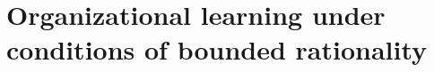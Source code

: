 \documentclass[12pt, man, natbib]{apa6}
\begin{document}
	\section{Organizational learning under conditions of bounded rationality}
	
	
	
%	
%	
%	
	
	


\end{document}
